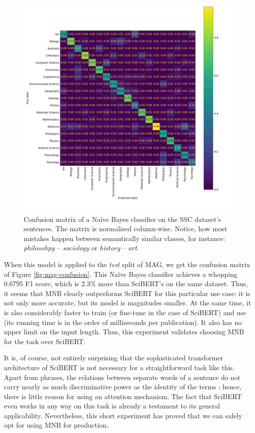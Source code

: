 \begin{figure}
    \centering
    \includegraphics[width=\linewidth]{figures/ss-confusion.png}
    \captionsetup{width=.9\linewidth}
    \caption{Confusion matrix of a Naïve Bayes classifier on the SSC dataset's sentences. The matrix is normalised column-wise. Notice, how most mistakes happen between semantically similar classes, for instance:  \textit{philosohpy} -- \textit{sociology} or \textit{history} -- \textit{art}.}
    \label{fig:ss-confusion}
\end{figure}

When this model is applied to the \textit{test} split of MAG, we get the confusion matrix of Figure \ref{fig:mag-confusion}. This Naïve Bayes classifier achieves a whopping $0.6795$ F1 score, which is $2.3\%$ more than SciBERT's on the same dataset. Thus, it seems that MNB clearly outperforms SciBERT for this particular use case: it is not only more accurate, but its model is magnitudes smaller. At the same time, it is also considerably faster to train (or fine-tune in the case of SciBERT) and use (its running time is in the order of milliseconds per publication). It also has no upper limit on the input length. Thus, this experiment validates choosing MNB for the task over SciBERT.

It is, of course, not entirely surprising that the sophisticated transformer architecture of SciBERT is not necessary for a straightforward task like this. Apart from phrases, the relations between separate words of a sentence do not carry nearly as much discriminative power as the identity of the terms \cite{hand2001idiot}; hence, there is little reason for using an attention mechanism. The fact that SciBERT even works in any way on this task is already a testament to its general applicability. Nevertheless, this short experiment has proved that we can safely opt for using MNB for production.

